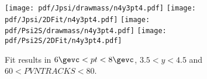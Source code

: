 \begin{figure}[H]
\begin{center}
\texttt{[image: pdf/Jpsi/drawmass/n4y3pt4.pdf]}
\texttt{[image: pdf/Jpsi/2DFit/n4y3pt4.pdf]}
\vspace*{-0.5cm}
\texttt{[image: pdf/Psi2S/drawmass/n4y3pt4.pdf]}
\texttt{[image: pdf/Psi2S/2DFit/n4y3pt4.pdf]}
\vspace*{-0.5cm}
\end{center}
\caption{Fit results in $6\gevc<pt<8\gevc$, $3.5<y<4.5$ and $60<PVNTRACKS<80$.}
\label{Fitn4y3pt4}
\end{figure}
